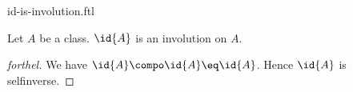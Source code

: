 \documentclass{stex}
\begin{document}
\begin{smodule}{id-is-involution.ftl}


\begin{proposition}[forthel,id=IdIsInvolProp]
  Let $A$ be a class.
  $\id{A}$ is an involution on $A$.
\end{proposition}
\begin{proof}[forthel]
  We have $\id{A} \compo \id{A} \eq \id{A}$.
  Hence $\id{A}$ is selfinverse.
\end{proof}

\end{smodule}
\end{document}
